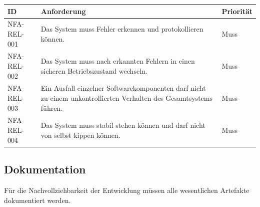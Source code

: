 \documentclass[
  a4paper,
  12pt,
  DIV=12,        %
  parskip=half,  %
  headings=small %
]{scrartcl}
\theoremstyle{definition}
\theoremstyle{definition}
\begin{document}
\begin{longtable}[]{@{}
  >{\raggedright\arraybackslash}p{}
  >{\raggedright\arraybackslash}p{}
  >{\raggedright\arraybackslash}p{}@{}}
\toprule\noalign{}
\begin{minipage}[b]{\linewidth}\raggedright
ID
\end{minipage} & \begin{minipage}[b]{\linewidth}\raggedright
Anforderung
\end{minipage} & \begin{minipage}[b]{\linewidth}\raggedright
Priorität
\end{minipage} \\
\midrule\noalign{}
\endhead
\bottomrule\noalign{}
\endlastfoot
NFA-REL-001 & Das System muss Fehler erkennen und protokollieren können.
& Muss \\
NFA-REL-002 & Das System muss nach erkannten Fehlern in einen sicheren
Betriebszustand wechseln. & Muss \\
NFA-REL-003 & Ein Ausfall einzelner Softwarekomponenten darf nicht zu
einem unkontrollierten Verhalten des Gesamtsystems führen. & Muss \\
NFA-REL-004 & Das System muss stabil stehen können und darf nicht von
selbst kippen können. & Muss \\
\end{longtable}

\subsection{Dokumentation}\label{dokumentation}

Für die Nachvollziehbarkeit der Entwicklung müssen alle wesentlichen
Artefakte dokumentiert werden.
\end{document}
